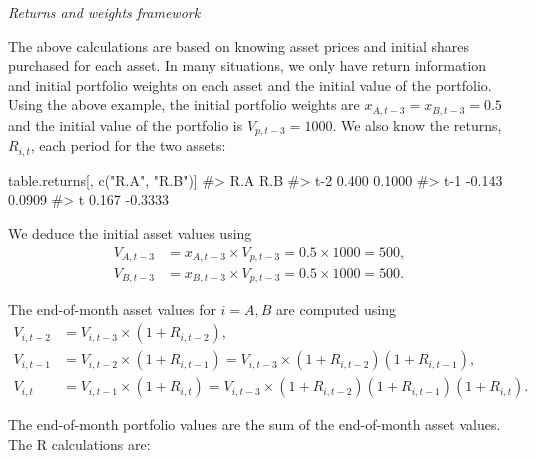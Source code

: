\documentclass[
  letterpaper,
  DIV=11,
  numbers=noendperiod]{scrreprt}
\newenvironment{Shaded}{\begin{snugshade}}{\end{snugshade}}
\newcommand{\CommentTok}[1]{\textcolor[rgb]{0.37,0.37,0.37}{#1}}
\newcommand{\FunctionTok}[1]{\textcolor[rgb]{0.28,0.35,0.67}{#1}}
\newcommand{\NormalTok}[1]{\textcolor[rgb]{0.00,0.23,0.31}{#1}}
\newcommand{\StringTok}[1]{\textcolor[rgb]{0.13,0.47,0.30}{#1}}
\theoremstyle{definition}
\theoremstyle{definition}
\theoremstyle{remark}
\begin{document}
\emph{Returns and weights framework}

The above calculations are based on knowing asset prices and initial
shares purchased for each asset. In many situations, we only have return
information and initial portfolio weights on each asset and the initial
value of the portfolio. Using the above example, the initial portfolio
weights are \(x_{A,t-3}=x_{B,t-3}=0.5\) and the initial value of the
portfolio is \(V_{p,t-3}=1000\). We also know the returns, \(R_{i,t}\),
each period for the two assets:

\begin{Shaded}
\begin{Highlighting}[]
\NormalTok{table.returns[, }\FunctionTok{c}\NormalTok{(}\StringTok{"R.A"}\NormalTok{, }\StringTok{"R.B"}\NormalTok{)]}
\CommentTok{\#\textgreater{}        R.A     R.B}
\CommentTok{\#\textgreater{} t{-}2  0.400  0.1000}
\CommentTok{\#\textgreater{} t{-}1 {-}0.143  0.0909}
\CommentTok{\#\textgreater{} t    0.167 {-}0.3333}
\end{Highlighting}
\end{Shaded}

We deduce the initial asset values using \begin{align}
V_{A,t-3} &= x_{A,t-3}\times V_{p,t-3} = 0.5\times 1000 = 500, \\
V_{B,t-3} &= x_{B,t-3}\times V_{p,t-3} = 0.5\times 1000 = 500.
\end{align}

The end-of-month asset values for \(i=A,B\) are computed using
\begin{align*}
V_{i,t-2} &= V_{i,t-3}\times (1+R_{i,t-2}), \\
V_{i,t-1} &= V_{i,t-2}\times (1+R_{i,t-1}) = V_{i,t-3}\times (1+R_{i,t-2})(1+R_{i,t-1}), \\
V_{i,t} &= V_{i,t-1}\times (1+R_{i,t}) = V_{i,t-3}\times (1+R_{i,t-2})(1+R_{i,t-1})(1+R_{i,t}).
\end{align*}

The end-of-month portfolio values are the sum of the end-of-month asset
values. The R calculations are:
\end{document}
